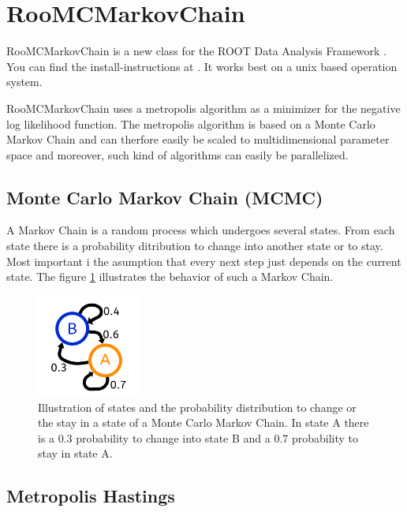 \documentclass[english]{uzhpub}
\begin{document}
%


\section{RooMCMarkovChain} \label{sec:RooMCMC}
RooMCMarkovChain is a new class for the ROOT Data Analysis Framework \cite{bib:root}. You can find the install-instructions at \cite{bib:root}. It works best on a unix based operation system.

 RooMCMarkovChain uses a metropolis algorithm as a minimizer for the negative log likelihood function. The metropolis algorithm is based on a Monte Carlo Markov Chain and can therfore easily be scaled to multidimensional parameter space and moreover, such kind of algorithms can easily be parallelized.

\subsection{Monte Carlo Markov Chain (MCMC)}  \label{sec:MCMC}
A Markov Chain is a random process which undergoes several states. From each state there is a probability ditribution to change into another state or to stay. Most important i the asumption that every next step just depends on the current state.
The figure \ref{fig:MCMC} illustrates the behavior of such a Markov Chain.

\begin{figure}[H]
  \centering
  \includegraphics[width=0.3\textwidth]{MCMC_Chain}
  \caption{Illustration of states and the probability distribution to change or the stay in a state of a Monte Carlo Markov Chain. In state A there is a 0.3 probability to change into state B and a 0.7 probability to stay in state A.}
  \label{fig:MCMC}
\end{figure}

\subsection{Metropolis Hastings}
\end{document}
